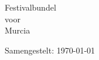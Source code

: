 \documentclass[10pt,a4paper,twoside]{article}
\begin{document}
\begin{center}
\Huge{Festivalbundel\\voor\\Murcia}
\end{center}
\vspace*{\fill}
\tableofcontents
\vspace{1em}
\hfill\small{Samengestelt: \today}


\end{document}
